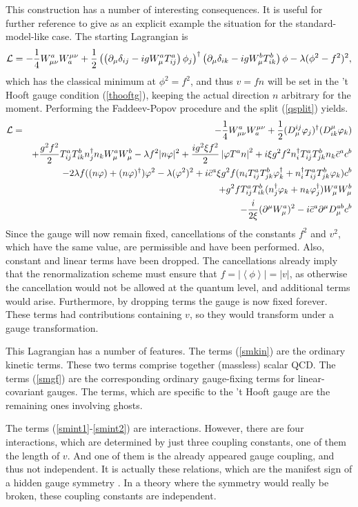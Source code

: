 \documentclass[final,twoside,12pt]{article}
\newcommand*{\La}{{\cal{L}}}
\newcommand*{\no}{\noindent}
\newcommand*{\bea}{\begin{eqnarray}}
\newcommand*{\eea}{\end{eqnarray}}
\newcommand*{\be}{\begin{equation}}
\newcommand*{\ee}{\end{equation}}
\newcommand*{\pd}{\partial}
\newcommand*{\pdm}{\pd_{\mu}}
\newcommand*{\pref}[1]{(\ref{#1})}
\newcommand*{\mn}{{\mu\nu}}
\newcommand*{\prefr}[2]{(\ref{#1}-\ref{#2})}
\newcommand*{\1}{1\!\!\!\bot}
\newcommand*{\la}{\left\langle}
\newcommand*{\ra}{\right\rangle}
\begin{document}
This construction has a number of interesting consequences. It is useful for further reference to give as an explicit example the situation for the standard-model-like case. The starting Lagrangian is
\be
\La=-\frac{1}{4}W_\mn^a W_a^\mn+\frac{1}{2}\left(\left(\pdm\delta_{ij}-igW_\mu^aT^a_{ij}\right)\phi_j\right)^\dagger\left(\pdm\delta_{ik}-igW_\mu^bT^b_{ik}\right)\phi-\lambda(\phi^2-f^2)^2\label{higgsyml},
\ee
\no which has the classical minimum at $\phi^2=f^2$, and thus $v=fn$ will be set in the 't Hooft gauge condition \pref{thooftg}, keeping the actual direction $n$ arbitrary for the moment. Performing the Faddeev-Popov procedure and the split \pref{qsplit} yields.
\bea
\La&=&-\frac{1}{4}W_\mn^a W_a^\mn+\frac{1}{2}(D_\mu^{ij}\varphi_j)^\dagger(D_{ik}^\mu\varphi_k)\label{smkin}\\
&&+\frac{g^2f^2}{2}T^a_{ij}T^b_{ik}n_j^\dagger n_kW_\mu^a W_\mu^b-\lambda f^2|n\varphi|^2+\frac{ig^2\xi f^2}{2}\left|\varphi T^an\right|^2+i\xi g^2f^2 n_i^\dagger T^a_{ij}T^b_{jk}n_k\bar{c}^a c^b\label{smmass}\\
&&-2\lambda f((n\varphi)+(n\varphi)^\dagger)\varphi^2-\lambda(\varphi^2)^2+i\bar{c}^a\xi g^2 f(n_iT^a_{ij}T^b_{jk}\varphi_k^\dagger+n_i^\dagger T^a_{ij}T^b_{jk}\varphi_k) c^b\label{smint1}\\
&&+g^2 fT^a_{ij}T^b_{ik}(n^\dagger_j\varphi_k+n_k\varphi_j^\dagger)W_\mu^aW_\mu^b\label{smint2}\\
&&-\frac{i}{2\xi}(\pd^\mu W_\mu^a)^2-i\bar{c}^a\pd^\mu D_\mu^{ab}c^b\label{smgf}
\eea
\no Since the gauge will now remain fixed, cancellations of the constants $f^2$ and $v^2$, which have the same value, are permissible and have been performed. Also, constant and linear terms have been dropped. The cancellations already imply that the renormalization scheme must ensure that $f=|\la\phi\ra|=|v|$, as otherwise the cancellation would not be allowed at the quantum level, and additional terms would arise. Furthermore, by dropping terms the gauge is now fixed forever. These terms had contributions containing $v$, so they would transform under a gauge transformation.

This Lagrangian has a number of features. The terms \pref{smkin} are the ordinary kinetic terms. These two terms comprise together (massless) scalar QCD. The terms \pref{smgf} are the corresponding ordinary gauge-fixing terms for linear-covariant gauges. The terms, which are specific to the 't Hooft gauge are the remaining ones involving ghosts.

The terms \prefr{smint1}{smint2} are interactions. However, there are four interactions, which are determined by just three coupling constants, one of them the length of $v$. And one of them is the already appeared gauge coupling, and thus not independent. It is actually these relations, which are the manifest sign of a hidden gauge symmetry \cite{O'Raifeartaigh:1978kv}. In a theory where the symmetry would really be broken, these coupling constants are independent.
\end{document}
